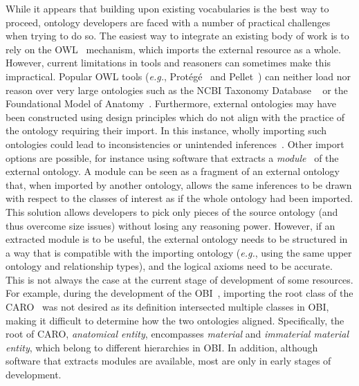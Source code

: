 \documentclass[jou]{ao2e}%
\begin{document}
While it appears that building upon existing vocabularies is the best way to proceed, ontology developers are faced with a number of practical challenges when trying to do so.
The easiest way to integrate an existing body of work is to rely on the \ac{OWL}~\citep{OWL} mechanism, which imports the external resource as a whole.
However, current limitations in tools and reasoners can sometimes make this impractical.
Popular OWL tools (\emph{e.g.}, Prot\'eg\'e~\citep{Protege} and Pellet~\citep{Sirin}) can neither load nor reason over very large ontologies such as the NCBI Taxonomy Database ~\citep{NCBI} or the Foundational Model of Anatomy~\citep{FMA}.
Furthermore, external ontologies may have been constructed using design principles which do not align with the practice of the ontology requiring their import.  In this instance, wholly importing such ontologies could lead to inconsistencies or unintended inferences~\citep{dl07}. 
Other import options are possible, for instance using software that extracts a \emph{module}~\citep{Grau} of the external ontology.
A module can be seen as a fragment of an external ontology that, when imported by another ontology, allows the same inferences to be drawn with respect to the classes of interest as if the whole ontology had been imported. This solution allows developers to pick only pieces of the source ontology (and thus overcome size issues) without losing any reasoning power.
However, if an extracted module is to be useful, the external ontology needs to be structured in a way that is compatible with the importing ontology (\emph{e.g.}, using the same upper ontology and relationship types), and the logical axioms need to be accurate. 
This is not always the case at the current stage of development of some resources.
For example, during the development of the \ac{OBI}~\citep{OBI}, importing the root class of the \ac{CARO}~\citep{CARO} was not desired as its definition intersected multiple classes in \ac{OBI}, making it difficult to determine how the two ontologies aligned. Specifically, the root of CARO, \emph{anatomical entity}, encompasses \emph{material} and \emph{immaterial material entity}, which belong to different hierarchies in OBI.
In addition, although software that extracts modules are available, most are only in early stages of development.
\end{document}

